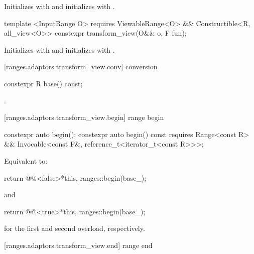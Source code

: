\begin{itemdescr}
\pnum
\effects Initializes  with  and initializes
 with .
\end{itemdescr}

%
\begin{itemdecl}
template <InputRange O>
  requires ViewableRange<O> && Constructible<R, all_view<O>>
constexpr transform_view(O&& o, F fun);
\end{itemdecl}

\begin{itemdescr}
\pnum
\effects Initializes  with 
and initializes  with .
\end{itemdescr}

[ranges.adaptors.transform_view.conv]{ conversion}

%
\begin{itemdecl}
constexpr R base() const;
\end{itemdecl}

\begin{itemdescr}
\pnum
\returns {}.
\end{itemdescr}

[ranges.adaptors.transform_view.begin]{ range begin}

%
\begin{itemdecl}
constexpr auto begin();
constexpr auto begin() const requires Range<const R> &&
  Invocable<const F&, reference_t<iterator_t<const R>>>;
\end{itemdecl}

\begin{itemdescr}
\pnum
\effects Equivalent to:
\begin{codeblock}
return @@<false>{*this, ranges::begin(base_)};
\end{codeblock}
  and
\begin{codeblock}
return @@<true>{*this, ranges::begin(base_)};
\end{codeblock}
for the first and second overload, respectively.
\end{itemdescr}

[ranges.adaptors.transform_view.end]{ range end}

